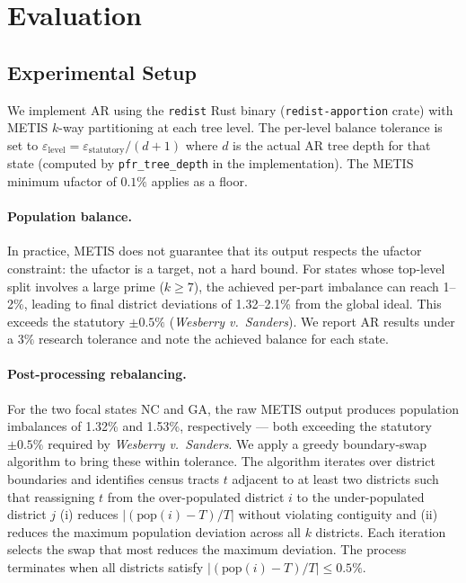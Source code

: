 \section{Evaluation}
\label{sec:evaluation}

\subsection{Experimental Setup}
\label{sec:eval:setup}

We implement AR using the \texttt{redist} Rust binary (\texttt{redist-apportion}
crate) with METIS $k$-way partitioning at each tree level. The per-level balance
tolerance is set to $\varepsilon_{\text{level}} = \varepsilon_{\text{statutory}} /
(d+1)$ where $d$ is the actual AR tree depth for that state (computed by
\texttt{pfr\_tree\_depth} in the implementation). The METIS minimum ufactor of
$0.1\%$ applies as a floor.

\paragraph{Population balance.}
In practice, METIS does not guarantee that its output respects the ufactor
constraint: the ufactor is a target, not a hard bound. For states whose
top-level split involves a large prime ($k \geq 7$), the achieved per-part
imbalance can reach 1--2\%, leading to final district deviations of 1.32--2.1\%
from the global ideal. This exceeds the statutory $\pm 0.5\%$
(\emph{Wesberry v.\ Sanders}). We report AR results under a $3\%$ research
tolerance and note the achieved balance for each state.

\paragraph{Post-processing rebalancing.}
For the two focal states NC and GA, the raw METIS output produces population
imbalances of 1.32\% and 1.53\%, respectively --- both exceeding the statutory
$\pm 0.5\%$ required by \emph{Wesberry v.\ Sanders}.
We apply a greedy boundary-swap algorithm to bring these within tolerance.
The algorithm iterates over district boundaries and identifies census tracts
$t$ adjacent to at least two districts such that reassigning $t$ from the
over-populated district $i$ to the under-populated district $j$ (i) reduces
$|(\mathrm{pop}(i) - T) / T|$ without violating contiguity and (ii) reduces
the maximum population deviation across all $k$ districts.
Each iteration selects the swap that most reduces the maximum deviation.
The process terminates when all districts satisfy $|(\mathrm{pop}(i) - T)/T| \leq 0.5\%$.

